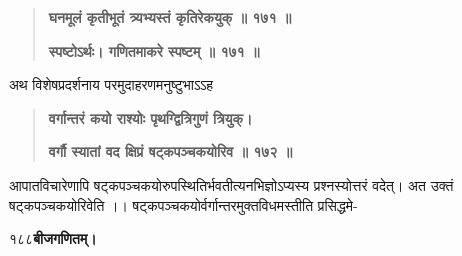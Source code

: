 \documentclass[11pt, openany]{book}
\begin{document}
\begin{sloppypar}
\begin{quote}
\hspace{1in}\textbf{घनमूलं कृतीभूतं त्र्यभ्यस्तं कृतिरेकयुक् ॥ १७१ ॥}

\hspace{1in}\textbf{स्पष्टोऽर्थः। गणितमाकरे स्पष्टम् ॥ १७१ ॥}
\end{quote}

\hangindent=0.2in \hspace{0.2in}अथ विशेषप्रदर्शनाय परमुदाहरणमनुष्टुभाऽऽह\textendash

\begin{quote}
\hspace{1in}\textbf{वर्गान्तरं कयो राश्योः पृथग्द्वित्रिगुणं त्रियुक्।}

\hspace{1in}\textbf{वर्गौ स्यातां वद क्षिप्रं षट्कपञ्चकयोरिव ॥ १७२ ॥}
\end{quote}

\hangindent=0.2in \hspace{0.2in}आपातविचारेणापि षट्कपञ्चकयोरुपस्थितिर्भवतीत्यनभिज्ञोऽप्यस्य प्रश्नस्योत्तरं वदेत्। अत उक्तं षट्कपञ्चकयोरिवेति ।। षट्कपञ्चकयोर्वर्गान्तरमुक्तविधमस्तीति प्रसिद्धमे-
\end{sloppypar}
\thispagestyle{empty}
\newpage

\onehalfspacing
१८८\hspace{2in}\textbf{बीजगणितम्।} 

\vspace{5mm}
\end{document}
